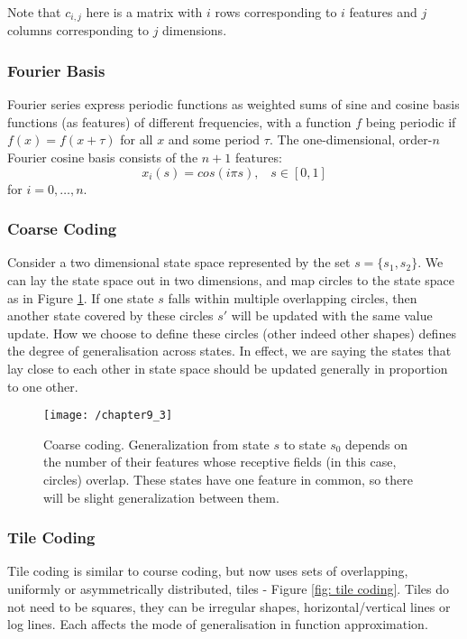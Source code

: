 Note that $c_{i,j}$ here is a matrix with $i$ rows corresponding to $i$ features and $j$ columns corresponding to $j$ dimensions.

\subsubsection{Fourier Basis}
Fourier series express periodic functions as weighted sums of sine and cosine basis functions (as features) of different frequencies, with a function $f$ being periodic if $f(x) = f(x + \tau)$ for all $x$ and some period $\tau$. The one-dimensional, order-$n$ Fourier cosine basis consists of the $n+1$ features:
\begin{equation}
	x_i(s) = cos(i\pi s), \; \; \; s \in [0,1]
\end{equation}
for $i = 0, \ldots, n$.

\subsubsection{Coarse Coding}
Consider a two dimensional state space represented by the set $s = \{s_1, s_2\}$. We can lay the state space out in two dimensions, and map circles to the state space as in Figure \ref{fig: coarse coding}. If one state $s$ falls within multiple overlapping circles, then another state covered by these circles $s'$ will be updated with the same value update. How we choose to define these circles (other indeed other shapes) defines the degree of generalisation across states. In effect, we are saying the states that lay close to each other in state space should be updated generally in proportion to one other.

\begin{figure}[h!]
	\centering
	\texttt{[image: /chapter9\_3]}
	\caption{Coarse coding. Generalization from state $s$ to state $s_0$ depends on the number of their features whose receptive fields (in this case, circles) overlap. These states have one feature in common, so there will be slight generalization between them.}
	\label{fig: coarse coding}
\end{figure}

\subsubsection{Tile Coding}
Tile coding is similar to course coding, but now uses sets of overlapping, uniformly or asymmetrically distributed, tiles - Figure \ref{fig: tile coding}.  Tiles do not need to be squares, they can be irregular shapes, horizontal/vertical lines or log lines. Each affects the mode of generalisation in function approximation.

